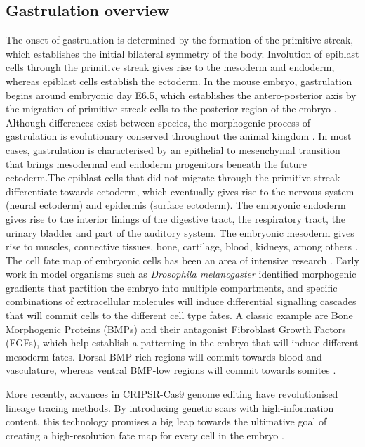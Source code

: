 \subsection{Gastrulation overview}
The onset of gastrulation is determined by the formation of the primitive streak, which establishes the initial bilateral symmetry of the body. Involution of epiblast cells through the primitive streak gives rise to the mesoderm and endoderm, whereas epiblast cells establish the ectoderm. In the mouse embryo, gastrulation begins around embryonic day E6.5, which establishes the antero-posterior axis by the migration of primitive streak cells to the posterior region of the embryo \cite{Arnold2009,Tam2007,Tam1997,Tam1993}. Although  differences exist between species, the morphogenic process of gastrulation is evolutionary conserved throughout the animal kingdom \cite{Solnica-Krezel2012}.\n
In most cases, gastrulation is characterised by an epithelial to mesenchymal transition that brings mesodermal end endoderm progenitors beneath the future ectoderm.The epiblast cells that did not migrate through the primitive streak differentiate towards ectoderm, which eventually gives rise to the nervous system (neural ectoderm) and epidermis (surface ectoderm). The embryonic endoderm gives rise to the interior linings of the digestive tract, the respiratory tract, the urinary bladder and part of the auditory system. The embryonic mesoderm gives rise to muscles, connective tissues, bone, cartilage, blood, kidneys, among others \cite{XX}. 
The cell fate map of embryonic cells has been an area of intensive research \cite{XX}. Early work in model organisms such as \textit{Drosophila melanogaster} identified morphogenic gradients that partition the embryo into multiple compartments, and specific combinations of extracellular molecules will induce differential signalling cascades that will commit cells to the different cell type fates. A classic example are Bone Morphogenic Proteins (BMPs) and their antagonist Fibroblast Growth Factors (FGFs), which help establish a patterning in the embryo that will induce different mesoderm fates. Dorsal BMP-rich regions will commit towards blood and vasculature, whereas ventral BMP-low regions will commit towards somites \cite{Dorey2010}.

More recently, advances in CRIPSR-Cas9 genome editing have revolutionised lineage tracing methods. By introducing genetic scars with high-information content, this technology promises a big leap towards the ultimative goal of creating a high-resolution fate map for every cell in the embryo \cite{McKenna2019,Chan2019}.


